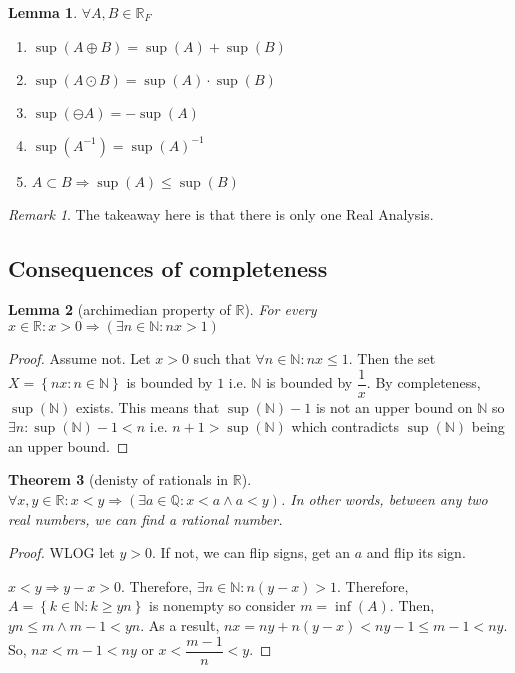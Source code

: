 \documentclass{article}
\newcommand\N{\ensuremath{\mathbb{N}}}
\newcommand\R{\ensuremath{\mathbb{R}}}
\newcommand\Q{\ensuremath{\mathbb{Q}}}
\newtheorem{theorem}{Theorem}[section]
\newtheorem{lemma}[theorem]{Lemma}
\theoremstyle{definition}
\theoremstyle{remark}
\newtheorem*{remark}{Remark}
\theoremstyle{plain}
\begin{document}
\begin{lemma}
    \(\forall A,B \in \R_F\) 
    \begin{enumerate}
        \item \(\sup(A\oplus B)=\sup(A)+\sup(B)\)
        \item \(\sup(A\odot B)=\sup(A)\cdot \sup(B)\)
        \item \(\sup(\ominus A)=-\sup(A)\)
        \item \(\sup(A^{-1}) = \sup(A)^{-1}\)
        \item \(A \subset B \Rightarrow \sup(A) \leq \sup(B)\)
    \end{enumerate}
\end{lemma}

\begin{remark}
    The takeaway here is that there is only one Real Analysis. 
\end{remark}

\subsection{Consequences of completeness}

\begin{lemma}[archimedian property of \(\R\)]
    For every \(x \in \R:x > 0 \Rightarrow (\exists n \in \N: nx > 1)\)
\end{lemma}

\begin{proof}
    Assume not. Let \(x > 0 \) such that \(\forall n \in \N: nx \leq 1\). Then the set \(X = \left\{ nx: n \in \N \right\}\) is bounded by \(1\) i.e. \(\N\) is bounded by \(\dfrac{1}{x}\).
    By completeness, \(\sup(\N)\) exists. This means that \(\sup(\N) - 1\) is not an upper bound on \(\N\) so \(\exists n: \sup(\N) - 1 < n\) i.e. \(n+1 > \sup(\N)\) which contradicts 
    \(\sup(\N)\) being an upper bound.
\end{proof}

\begin{theorem}[denisty of rationals in \(\R\)]
    \(\forall x,y \in \R: x < y \Rightarrow (\exists a \in \Q : x < a \land a < y)\). In other words, between any two real numbers, we can find a rational number. 
\end{theorem}

\begin{proof}
    WLOG let \(y > 0\). If not, we can flip signs, get an \(a\) and flip its sign. 

    \(x < y \Rightarrow y-x > 0\). Therefore, \(\exists n \in \N: n(y-x) > 1\). Therefore, \(A = \left\{ k \in \N:  k\geq yn  \right\}\) is nonempty
    so consider \(m = \inf(A)\). Then, \( yn \leq m \land m-1 < yn\). As a result, \(nx = ny + n(y-x) < ny - 1 \leq m - 1 < ny\). So, \(nx < m-1 < ny\) 
    or \(x < \dfrac{m-1}{n} < y\).
\end{proof}
\end{document}
